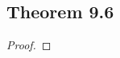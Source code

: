 \documentclass[../../main.tex]{subfiles}
\begin{document}
\subsection{Theorem 9.6}
\begin{wts}

\end{wts}
\begin{proof}

\end{proof}
\end{document}

